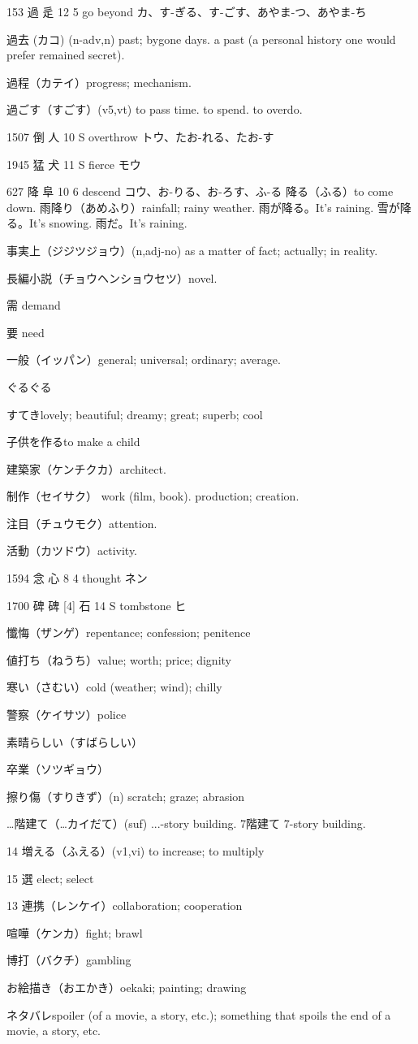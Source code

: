 153	過		辵	12	5		go beyond	カ、す-ぎる、す-ごす、あやま-つ、あやま-ち

過去 (カコ) (n-adv,n)
past; bygone days.
a past (a personal history one would prefer remained secret).

過程（カテイ）progress; mechanism.

過ごす（すごす）(v5,vt) to pass time. to spend. to overdo.

1507	倒		人	10	S		overthrow	トウ、たお-れる、たお-す

1945	猛		犬	11	S		fierce	モウ

627	降		阜	10	6		descend	コウ、お-りる、お-ろす、ふ-る
降る（ふる）to come down.
雨降り（あめふり）rainfall; rainy weather.
雨が降る。It's raining.
雪が降る。It's snowing.
雨だ。It's raining.

事実上（ジジツジョウ）(n,adj-no)
as a matter of fact; actually; in reality.

長編小説（チョウヘンショウセツ）novel.

需 demand

要 need

一般（イッパン）general; universal; ordinary; average.

ぐるぐる

すてきlovely; beautiful; dreamy; great; superb; cool


子供を作るto make a child

建築家（ケンチクカ）architect.

制作（セイサク）
work (film, book).
production; creation.

注目（チュウモク）attention.

活動（カツドウ）activity.

1594	念		心	8	4		thought	ネン

1700	碑	碑 [4]	石	14	S		tombstone	ヒ

懺悔（ザンゲ）repentance; confession; penitence

値打ち（ねうち）value; worth; price; dignity

寒い（さむい）cold (weather; wind); chilly

警察（ケイサツ）police

素晴らしい（すばらしい）

卒業（ソツギョウ）

擦り傷（すりきず）(n) scratch; graze; abrasion

…階建て（…カイだて）(suf) ...-story building.
7階建て 7-story building.

14 増える（ふえる）(v1,vi) to increase; to multiply

15 選 elect; select

13 連携（レンケイ）collaboration; cooperation

喧嘩（ケンカ）fight; brawl

博打（バクチ）gambling

お絵描き（おエかき）oekaki; painting; drawing

ネタバレspoiler (of a movie, a story, etc.); something that spoils the end of a movie, a story, etc.
